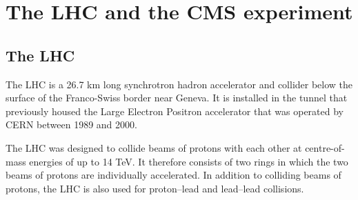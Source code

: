 \chapter{The \acs{LHC} and the \acs{CMS} experiment}
\label{chap:CMSLHC}

\section{The \acs{LHC}}
\label{sec:CMSLHC_LHC}

The \acf{LHC} \cite{lhc-machine}  is a 26.7 km long synchrotron hadron accelerator and collider below the surface of the 
Franco-Swiss border near Geneva. It
is installed in the tunnel that previously housed the Large Electron Positron accelerator
that was operated by \acf{CERN} between 1989 and 2000.

The \ac{LHC} was designed to collide beams of protons with each other at centre-of-mass
energies of up to 14 TeV. It therefore consists of two rings in which the two beams
of protons are individually accelerated. In addition to colliding beams of protons, the \ac{LHC}
is also used for proton--lead and lead--lead collisions.

